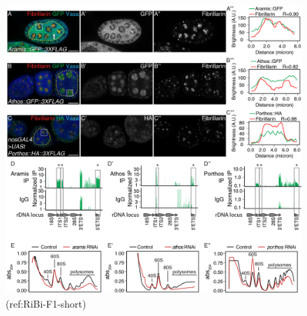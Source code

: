 \documentclass[12pt,oneside]{reedthesis}
\begin{document}
\begin{figure}

{\centering \includegraphics[width=6.5 in,height=8.9375 in]{./figure/Ribosome Biogenesis/Ribosome Biogenesis 2} 

}

\caption[(ref:RiBi-F1-short)]{(ref:RiBi-F1-short)}\label{fig:unnamed-chunk-8}
\end{figure}
\end{document}
